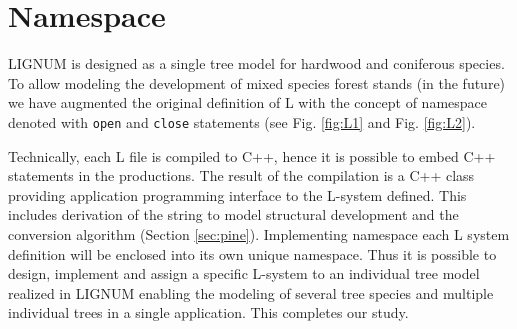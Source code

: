 \section{Namespace}\label{sec:namespace}
LIGNUM is designed as a  single tree model for hardwood and coniferous
species.  To  allow modeling the  development of mixed  species forest
stands (in the future) we  have augmented the original definition of L
with  the   concept  of  namespace  denoted   with  \texttt{open}  and
\texttt{close}   statements   (see    Fig.   \ref{fig:L1}   and   Fig.
\ref{fig:L2}).
 
Technically, each L  file is compiled to C++, hence  it is possible to
embed C++ statements in the productions. The result of the compilation
is  a C++  class providing  application programming  interface  to the
L-system  defined. This  includes derivation  of the  string  to model
structural   development  and   the   conversion  algorithm   (Section
\ref{sec:pine}).  Implementing namespace each L system definition will
be  enclosed into its  own unique  namespace. Thus  it is  possible to
design, implement and assign a specific L-system to an individual tree
model realized in LIGNUM enabling the modeling of several tree species
and multiple individual trees  in a single application. This completes
our study.

